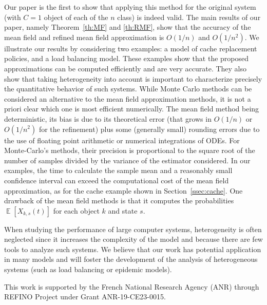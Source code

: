 \documentclass[acmsmall]{acmart}
\DeclareMathOperator{\E}{\mathbb{E}} %
\newcommand\esp[1]{\E\left[#1\right]} %
\begin{document}
Our paper is the first to show that applying this method for the original system (with $C=1$ object of each of the $n$ class) is indeed valid. The main results of our paper, namely Theorem~\ref{th:MF} and \ref{th:RMF}, show that the accuracy of the mean field and refined mean field approximation is $O(1/n)$ and $O(1/n^2)$. We illustrate our results by considering two examples: a model of cache replacement policies, and a load balancing model. These examples show that the proposed approximations can be computed efficiently and are very accurate. They also show that taking heterogeneity into account is important to characterize precisely the quantitative behavior of such systems. \color{neworange}
While Monte Carlo methods can be considered an alternative to the mean field approximation methods, it is not a priori clear which one is most efficient numerically. The mean field method being deterministic, its bias is due to its theoretical error (that grows in $O(1/n)$ or $O(1/n^2)$ for the refinement) plus some (generally small) rounding errors due to the use of floating point arithmetic or numerical integrations of ODEs. For Monte-Carlo's methods, their precision is proportional to the square root of the number of samples divided by the variance of the estimator considered.  In our examples, the time to calculate the sample mean and a reasonably small confidence interval can exceed the computational cost of the mean field approximation, as for the cache example shown in Section~\ref{ssec:cache}. One drawback of the mean field methods is that it computes the probabilities $\esp{X_{k,s}(t)}$ for each object $k$ and state $s$.
\color{black}

When studying the performance of large computer systems, heterogeneity is often neglected since it increases the complexity of the model and because there are few tools to analyze such systems. We believe that our work has potential application in many models and will foster the development of the analysis of heterogeneous systems (such as load balancing or epidemic models).

\begin{acks}
  This work is supported by the French National Research Agency (ANR) through REFINO Project under Grant ANR-19-CE23-0015.  
\end{acks}





\appendix 

\end{document}
